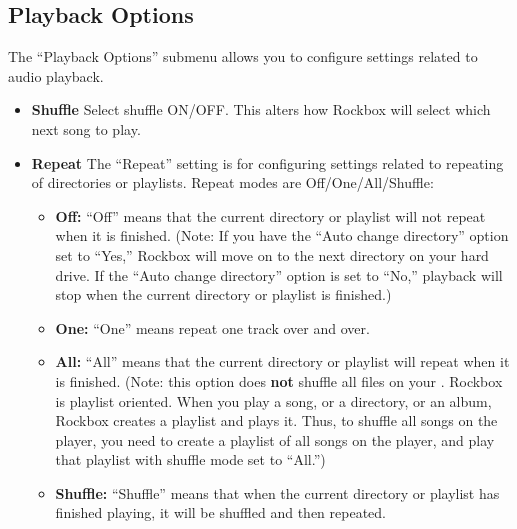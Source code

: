   \subsection{\label{ref:PlaybackOptions}Playback Options}
  The ``Playback Options'' submenu allows you to configure settings related to audio playback.
  
  \begin{itemize}
  \item \textbf{Shuffle}
    Select shuffle ON/OFF. This alters how Rockbox will select which next song to play.
  \item \textbf{Repeat}
    The ``Repeat'' setting is for configuring settings related to repeating of directories or playlists.  Repeat modes are Off/One/All/Shuffle: 
    \begin{itemize}
    \item \textbf{Off:  }``Off'' means that the current directory or playlist will not repeat when it is finished.  (Note:  If you have the ``Auto change directory'' option set to ``Yes,'' Rockbox will move on to the next directory on your hard drive.  If the ``Auto change directory'' option is set to ``No,'' playback will stop when the current directory or playlist is finished.)
    \item\textbf{One:  }``One'' means repeat one track over and over.
    \item\textbf{All:  } ``All'' means that the current directory or playlist will repeat when it is finished.  (Note:  this option does \textbf{not} shuffle all files on your \dap.  Rockbox is playlist oriented. When you play a song, or a directory, or an album, Rockbox creates a playlist and plays it. Thus, to shuffle all songs on the player, you need to create a playlist of all songs on the player, and play that playlist with shuffle mode set to ``All.'')
    \item\textbf{Shuffle:  }``Shuffle'' means that when the current directory or playlist has finished playing, it will be shuffled and then repeated.
    \end{itemize}
    

\end{itemize}
